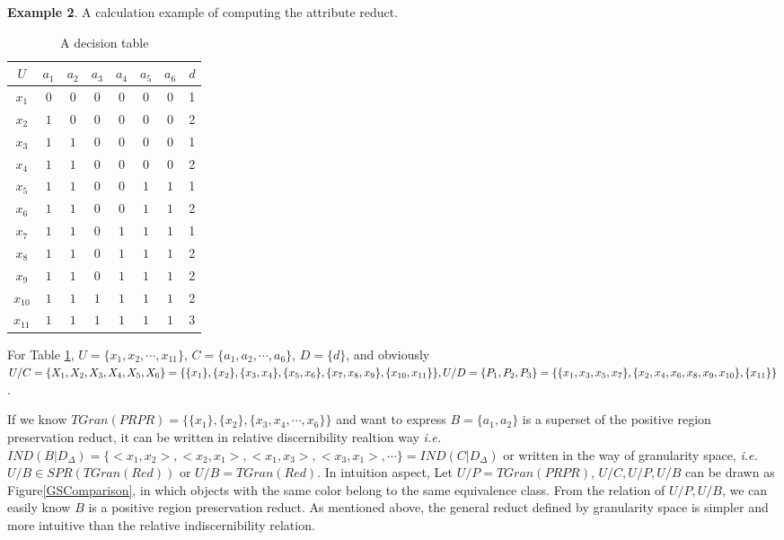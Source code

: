 \documentclass[review]{elsarticle}
\begin{document}
		\textbf{Example 2}.\label{calculationEx} A calculation example of computing the attribute reduct.\\
		\begin{table}[htbp]
			\caption{A decision table}
			\centering
				\begin{tabular}{cccccccc}
					\hline
					$U$ & $a_{1}$ & $a_{2}$ & $a_{3}$ & $a_{4}$ & $a_{5}$ & $a_{6}$ & $d$\\
					\hline
					$x_{1}$ & $0$ & $0$ & $0$ & $0$ & $0$ & $0$ & 1\\
					$x_{2}$ & $1$ & $0$ & $0$ & $0$ & $0$ & $0$ & 2\\
					$x_{3}$ & $1$ & $1$ & $0$ & $0$ & $0$ & $0$ & 1\\
					$x_{4}$ & $1$ & $1$ & $0$ & $0$ & $0$ & $0$ & 2\\
					$x_{5}$ & $1$ & $1$ & $0$ & $0$ & $1$ & $1$ & 1\\
					$x_{6}$ & $1$ & $1$ & $0$ & $0$ & $1$ & $1$ & 2\\
					$x_{7}$ & $1$ & $1$ & $0$ & $1$ & $1$ & $1$ & 1\\
					$x_{8}$ & $1$ & $1$ & $0$ & $1$ & $1$ & $1$ & 2\\
					$x_{9}$ & $1$ & $1$ & $0$ & $1$ & $1$ & $1$ & 2\\
					$x_{10}$ & $1$ & $1$ & $1$ & $1$ & $1$ & $1$ & 2\\
					$x_{11}$ & $1$ & $1$ & $1$ & $1$ & $1$ & $1$ & 3\\
					\hline
				\end{tabular}
			\label{tab:1}
		\end{table}
		\par For Table \ref{tab:1}, $U=\lbrace x_{1},x_{2},\cdots,x_{11}\rbrace$, $C=\lbrace a_{1}, a_{2},\cdots,a_{6} \rbrace$, $D=\lbrace d \rbrace$, and obviously $U/C=\lbrace X_{1},X_{2},X_{3},X_{4},X_{5},X_{6} \rbrace=\lbrace \lbrace x_{1} \rbrace,\lbrace x_{2} \rbrace,\lbrace x_{3},x_{4} \rbrace,\lbrace x_{5},x_{6} \rbrace,\\\lbrace x_{7},x_{8},x_{9} \rbrace,\lbrace x_{10},x_{11} \rbrace \rbrace,U/D=\lbrace P_{1},P_{2},P_{3} \rbrace=\lbrace \lbrace x_{1},x_{3},x_{5},x_{7} \rbrace,\lbrace x_{2},x_{4},x_{6},x_{8},\\x_{9},x_{10} \rbrace,\lbrace x_{11} \rbrace \rbrace$.
		\par If we know $TGran(PRPR)=\{\{x_1\},\{x_2\},\{x_3,x_4,\cdots,x_6\}\}$ and want to express $B=\{a_1,a_2\}$ is a superset of the positive region preservation reduct, it can be written in relative discernibility realtion way \emph{i.e.} $IND(B|D_\Delta)=\{<x_1,x_2>,<x_2,x_1>,<x_1,x_3>,<x_3,x_1>,\cdots\}=IND(C|D_\Delta)$ or written in the way of granularity space, \emph{i.e.} $U/B \in SPR(TGran(Red))$ or $U/B=TGran(Red)$. In intuition aspect, Let $U/P=TGran(PRPR)$,  $U/C,U/P,U/B$ can be drawn as Figure\ref{GSComparison}, in which objects with the same color belong to the same equivalence class. From the relation of $U/P, U/B$, we can easily know $B$ is a positive region preservation reduct. As mentioned above, the general reduct defined by granularity space is simpler and more intuitive than the relative indiscernibility relation.
\end{document}
